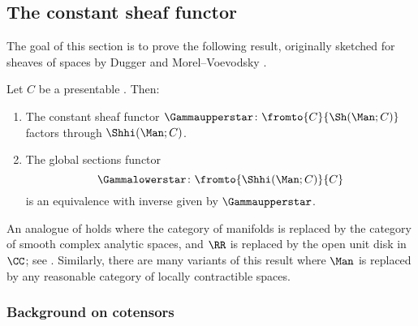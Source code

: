 
\subsection{The constant sheaf functor}\label{sec:constantsheafdescript}

The goal of this section is to prove the following result, originally sketched for sheaves of spaces by Dugger \cites[Theorem 3.4.3]{Duggersheaves}[Proposition 8.3]{MR1870515} and Morel--Voevodsky \cite[Proposition 3.3.3]{MR1813224}.

\begin{proposition}\label{prop:Dugger}
	Let $ C $ be a presentable \category.
	Then:
	\begin{enumerate}
		\item The constant sheaf functor $ \Gammaupperstar \colon \fromto{C}{\Sh(\Man;C)} $ factors through $ \Shhi(\Man;C) $.

		\item The global sections functor
		\begin{equation*}
			\Gammalowerstar \colon \fromto{\Shhi(\Man;C)}{C}
		\end{equation*}
		is an equivalence with inverse given by $ \Gammaupperstar $.
	\end{enumerate}
\end{proposition}

\begin{remark}
	An analogue of  holds where the category of manifolds is replaced by the category of smooth complex analytic spaces, and $ \RR $ is replaced by the open unit disk in $ \CC $; see \cite[Remarque 1.9]{MR2602027}.
	Similarly, there are many variants of this result where $ \Man $ is replaced by any reasonable category of locally contractible spaces.
\end{remark}


\subsubsection{Background on cotensors}

